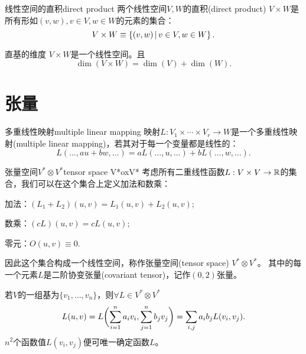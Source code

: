 \begin{definition}{线性空间的直积}{direct product}
	两个线性空间$V,W$的直积(direct product) $V\times W$是所有形如$(v,w),v\in V,w\in W$的元素的集合：
	\begin{equation}
		V\times W\equiv\left\{(v,w)\,\middle\vert\,v\in V,w\in W\right\}.
	\end{equation}
\end{definition}
\begin{theorem}{直基的维度}{}
	$V\times W$是一个线性空间。且
	\begin{equation}
		\dim(V\times W)=\dim(V)+\dim(W).
	\end{equation}
\end{theorem}
\section{张量}
\begin{definition}{多重线性映射}{multiple linear mapping}
	映射$L:V_1\times\cdots\times V_r\to W$是一个多重线性映射(multiple linear mapping)，若其对于每一个变量都是线性的：
	\[
		L(\ldots,au+bw,\ldots)=aL(\ldots,u,\ldots)+bL(\ldots,w,\ldots).
	\]
\end{definition}
\begin{definition}{张量空间$V^\ast\otimes V^\ast$}{tensor space V*oxV*}
	考虑所有二重线性函数$L:V\times V\to\mathbb R$的集合，我们可以在这个集合上定义加法和数乘：
	\begin{compactitem}
		\item 加法：$(L_1+L_2)(u,v)=L_1(u,v)+L_2(u,v);$
		\item 数乘：$(cL)(u,v)=cL(u,v);$
		\item 零元：$O(u,v)\equiv 0.$
	\end{compactitem}
	因此这个集合构成一个线性空间，称作张量空间(tensor space) $V^\ast\otimes V^\ast$。
	其中的每一个元素$L$是二阶协变张量(covariant tensor)，记作$(0,2)$张量。
\end{definition}
若$V$的一组基为$\{v_1,\ldots,v_n\}$，则$\forall L\in V^\ast\otimes V^\ast$ 
\[
	L(u,v)=L\biggl(\sum_{i=1}^na_iv_i,\sum_{j=1}^nb_jv_j\biggr)=\sum_{i,j}a_ib_jL(v_i,v_j).
\]
$n^2$个函数值$L(v_i,v_j)$便可唯一确定函数$L$。

